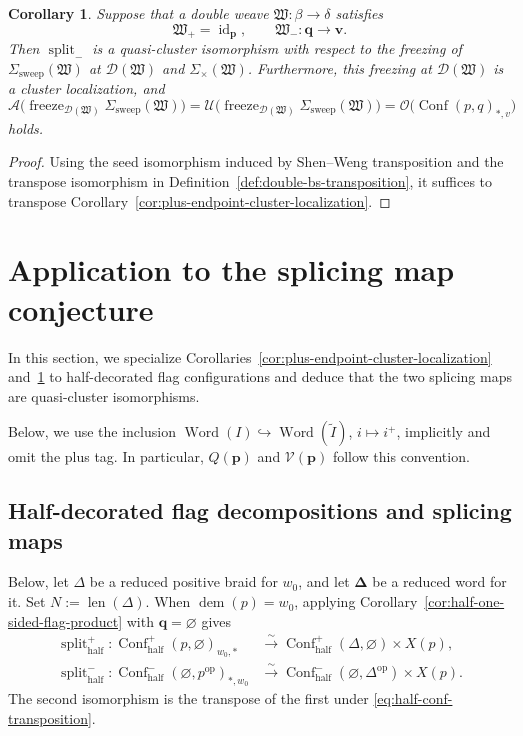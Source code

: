 \documentclass[10pt,a4paper]{article}
\newtheorem{corollary}[theorem]{Corollary}
\theoremstyle{definition}
\theoremstyle{remark}
\newcommand{\Conf}{\operatorname{Conf}}
\newcommand{\Confhalf}{\operatorname{Conf}_{\mathrm{half}}}
\newcommand{\Dcal}{\mathcal D}
\newcommand{\Vcal}{\mathcal V}
\newcommand{\fW}{\mathfrak W}
\newcommand{\Split}{\operatorname{split}}
\newcommand{\id}{\operatorname{id}}
\newcommand{\len}{\operatorname{len}}
\newcommand{\Word}{\operatorname{Word}}
\begin{document}
\begin{corollary}
\label{cor:minus-endpoint-cluster-localization}
Suppose that a double weave \(\fW:\beta\longrightarrow\delta\) satisfies
\[
 \fW_+=\id_{\mathbf p},
 \qquad
 \fW_-:\mathbf q\longrightarrow\mathbf v.
\]
Then \(\Split_-\) is a quasi-cluster isomorphism with respect to the freezing
of \(\Sigma_{\mathrm{sweep}}(\fW)\) at \(\Dcal(\fW)\) and
\(\Sigma_\times(\fW)\).  Furthermore, this freezing at \(\Dcal(\fW)\) is a
cluster localization, and
\[
 \mathcal A\bigl(
  \operatorname{freeze}_{\Dcal(\fW)}\Sigma_{\mathrm{sweep}}(\fW)
 \bigr)
 =\mathcal U\bigl(
  \operatorname{freeze}_{\Dcal(\fW)}\Sigma_{\mathrm{sweep}}(\fW)
 \bigr)
 =\mathcal O\bigl(\Conf(p,q)_{*,v}\bigr)
\]
holds.
\end{corollary}

\begin{proof}
Using the seed isomorphism induced by Shen--Weng transposition
\cite[Proposition~3.9]{ShenWeng2021} and the transpose isomorphism in
Definition~\ref{def:double-bs-transposition}, it suffices to transpose
Corollary~\ref{cor:plus-endpoint-cluster-localization}.
\end{proof}

\section{Application to the splicing map conjecture}
\label{sec:splicing-specialization}

In this section, we specialize
Corollaries~\ref{cor:plus-endpoint-cluster-localization}
and~\ref{cor:minus-endpoint-cluster-localization} to half-decorated flag
configurations and deduce that the two splicing maps are quasi-cluster
isomorphisms.

Below, we use the inclusion
\(\Word(I)\hookrightarrow\Word(\widetilde I)\), \(i\mapsto i^+\), implicitly
and omit the plus tag.  In particular, \(Q(\mathbf p)\) and
\(\Vcal(\mathbf p)\) follow this convention.

\subsection{Half-decorated flag decompositions and splicing maps}

Below, let \(\Delta\) be a reduced positive braid for \(w_0\), and let
\(\boldsymbol\Delta\) be a reduced word for it.  Set \(N:=\len(\Delta)\).  When
\(\operatorname{dem}(p)=w_0\), applying
Corollary~\ref{cor:half-one-sided-flag-product} with
\(\mathbf q=\varnothing\) gives
\begin{align*}
 \Split_{\mathrm{half}}^+:
 \Confhalf^+(p,\varnothing)_{w_0,*}
 &\xrightarrow{\sim}
 \Confhalf^+(\Delta,\varnothing)\times X(p),\\
 \Split_{\mathrm{half}}^-:
 \Confhalf^-(\varnothing,p^{\mathrm{op}})_{*,w_0}
 &\xrightarrow{\sim}
 \Confhalf^-(\varnothing,\Delta^{\mathrm{op}})\times X(p).
\end{align*}
The second isomorphism is the transpose of the first under
\eqref{eq:half-conf-transposition}.
\end{document}
